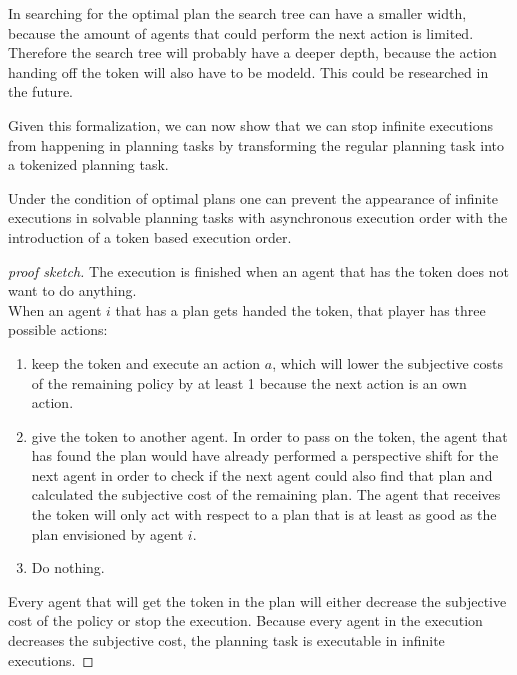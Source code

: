 In searching for the optimal plan the search tree can have a smaller width, because the amount of agents that could perform the next action is limited. Therefore the search tree will probably have a deeper depth, because the action handing off the token will also have to be modeld. This could be researched in the future.


Given this formalization, we can now show that we can stop infinite executions from happening in planning tasks by transforming the regular planning task into a tokenized planning task.

\begin{theorem}
Under the condition of optimal plans one can prevent the appearance of infinite executions in solvable planning tasks with asynchronous execution order with the introduction of a token based execution order.
\end{theorem}


\begin{proof}[proof sketch]
  The execution is finished when an agent that has the token does not want to do anything. \\
  When an agent $i$ that has a plan gets handed the token, that player has three possible actions:
  \begin{enumerate}
    \item keep the token and execute an action $a$, which will lower the subjective costs of the remaining policy by at least 1 because the next action is an own action.

    \item give the token to another agent. In order to pass on the token, the agent that has found the plan would have already performed a perspective shift for the next agent in order to check if the next agent could also find that plan and calculated the subjective cost of the remaining plan. The agent that receives the token will only act with respect to a plan that is at least as good as the plan envisioned by agent $i$.


    \item Do nothing.

  \end{enumerate}
  Every agent that will get the token in the plan will either decrease the subjective cost of the policy or stop the execution. Because every agent in the execution decreases the subjective cost, the planning task is executable in infinite executions.
\end{proof}


